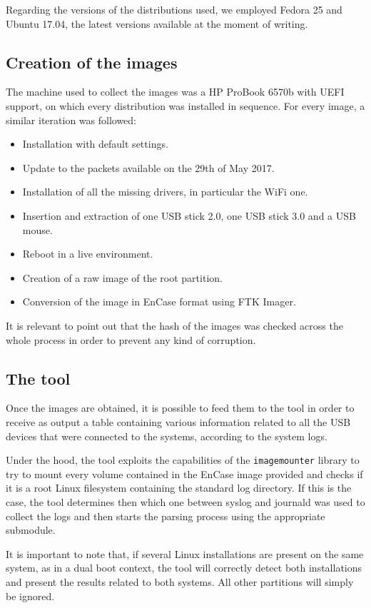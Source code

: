 \documentclass[a4paper]{article}
\begin{document}
Regarding the versions of the distributions used, we employed Fedora 25 and
Ubuntu 17.04, the latest versions available at the moment of writing.

\subsection{Creation of the images}
\label{sec:images}
The machine used to collect the images was a HP ProBook 6570b with UEFI
support, on which every distribution was installed in sequence. For every
image, a similar iteration was followed:
\begin{itemize}
\item Installation with default settings.
\item Update to the packets available on the 29th of May 2017.
\item Installation of all the missing drivers, in particular the WiFi one.
\item Insertion and extraction of one USB stick 2.0, one USB stick 3.0 and a USB
	mouse.
\item Reboot in a live environment.
\item Creation of a raw image of the root partition.
\item Conversion of the image in EnCase format using FTK Imager.
\end{itemize}
It is relevant to point out that the hash of the images was checked across the
whole process in order to prevent any kind of corruption.

\subsection{The tool}\label{sec:tool}
Once the images are obtained, it is possible to feed them to the tool in order
to receive as output a table containing various information related to all the
USB devices that were connected to the systems, according to the system logs.

Under the hood, the tool exploits the capabilities of the \texttt{imagemounter}
library to try to mount every volume contained in the EnCase image provided and
checks if it is a root Linux filesystem containing the standard log directory.
If this is the case, the tool determines then which one between syslog and
journald was used to collect the logs and then starts the parsing process using
the appropriate submodule.

It is important to note that, if several Linux installations are present on the
same system, as in a dual boot context, the tool will correctly detect both
installations and present the results related to both systems. All other
partitions will simply be ignored.
\end{document}
